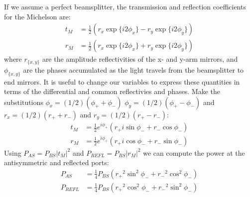 If we assume a perfect beamsplitter, the transmission and reflection
coefficients for the Michelson are:
%
\begin{align}
t_M  &= \frac{1}{2}\left(r_x \exp \{i2\phi_x\} - r_y \exp\{i2\phi_y\} \right) \\
r_M  &= \frac{1}{2}\left(r_x \exp \{i2\phi_x\} + r_y \exp\{i2\phi_y\} \right)
\end{align}
where $r_{\{x,y\}}$ are the amplitude reflectivities of the x- and y-arm mirrors, and $\phi_{\{x,y\}}$ are 
the phases accumulated as the light travels from the beamsplitter to end mirrors.  It is useful to change
our variables to express these quantities in terms of the differential and common reflectivies and phases.
Make the substitutions
$\phi_x = (1/2)\left(\phi_+ + \phi_-\right)$
$\phi_y = (1/2)\left(\phi_+ - \phi_-\right)$
and $r_x = (1/2)(r_+ + r_-)$ and $r_y = (1/2)(r_+ - r_-)$:
%
\begin{align}
t_M  &= \frac{1}{2} e^{i\phi_+} \left( r_+ i \sin \phi_- + r_- \cos \phi_- \right)\\
r_M  &= \frac{1}{2} e^{i\phi_+} \left( r_+ i \cos \phi_- + r_- \sin \phi_- \right) 
\end{align}
%
Using $P_{AS} = P_{BS} \left|t_M\right|^2$ and $P_{REFL} = P_{BS}
\left|r_M\right|^2$ we can compute the power at the antisymmetric and
reflected ports:
%
\begin{align}
P_{AS}   &=  \frac{1}{4}P_{BS}\left( {r_+}^2 \sin^2 \phi_- + {r_-}^2 \cos^2 \phi_-\right) \\
P_{REFL} &=  \frac{1}{4}P_{BS}\left( {r_+}^2 \cos^2 \phi_- + {r_-}^2 \sin^2 \phi_-\right) 
\end{align}

